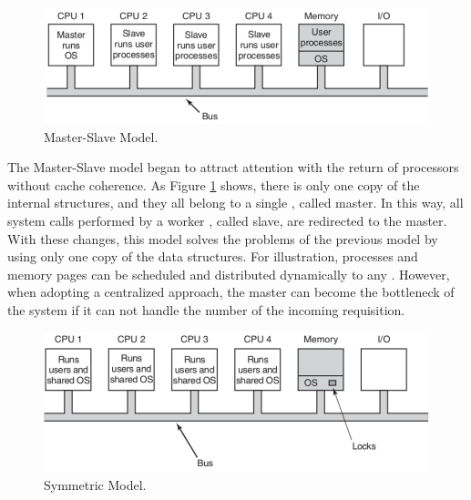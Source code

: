 			\begin{figure}[h]
				\centering
				\includegraphics[width=.8\textwidth]{images/master-slave-os.png}

				\caption{
					Master-Slave \os Model.
				}\par
				\label{fig.master-slave-os}
			\end{figure}

			The Master-Slave model began to attract attention with the return of
			processors without cache coherence.
			As Figure \ref{fig.master-slave-os} shows, there is only one copy of
			the internal \os structures, and they all belong to a single \cpu, called master.
			In this way, all system calls performed by a worker \cpu, called slave,
			are redirected to the master.
			With these changes, this model solves the problems of the previous model
			by using only one copy of the data structures.
			For illustration, processes and memory pages can be scheduled and
			distributed dynamically to any \cpus.
			However, when adopting a centralized approach, the master can become
			the bottleneck of the system if it can not handle the number of the
			incoming requisition.

			\begin{figure}[h]
				\centering
				\includegraphics[width=.8\textwidth]{images/smp-os.png}

				\caption{
					Symmetric \os Model.
				}\par
				\label{fig.smp-os}
			\end{figure}

